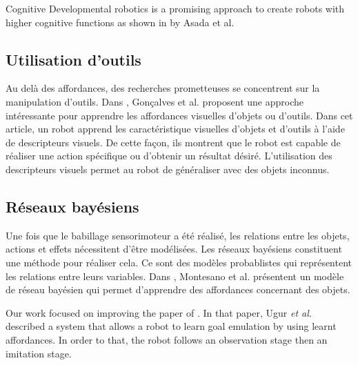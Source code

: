 \documentclass{llncs}
\begin{document}
Cognitive Developmental robotics is a promising approach to create robots with higher cognitive functions as shown in \cite{Asada2009} by Asada et al.





\subsection{Utilisation d'outils}
Au delà des affordances, des recherches prometteuses se concentrent sur la manipulation d'outils. Dans \cite{Goncalves2014}, Gonçalves et al. proposent une approche intéressante pour apprendre les affordances visuelles d'objets ou d'outils. Dans cet article, un robot apprend les caractéristique visuelles d'objets et d'outils à l'aide de descripteurs visuels. De cette façon, ils montrent que le robot est capable de réaliser une action spécifique ou d'obtenir un résultat désiré. L'utilisation des descripteurs visuels permet au robot de généraliser avec des objets inconnus.


\subsection{Réseaux bayésiens}
Une fois que le babillage sensorimoteur a été réalisé, les relations entre les objets, actions et effets nécessitent d'être modélisées. Les réseaux bayésiens constituent une méthode pour réaliser cela. Ce sont des modèles probablistes qui représentent les relations entre leurs variables. Dans \cite{4456755}, Montesano et al. présentent un modèle de réseau bayésien qui permet d'apprendre des affordances concernant des objets.

Our work focused on improving the paper of \cite{Ugur2011}. In that paper, Ugur \textit{et al}.
described a system that allows a robot to learn goal emulation by using learnt affordances. In order to that, the robot follows an observation stage then an imitation stage.
\end{document}
